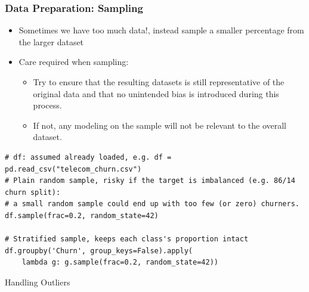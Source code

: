 
\begin{frame}[fragile]\frametitle{Data Preparation: Sampling}
\begin{itemize}
\item Sometimes we have too much data!, instead sample a smaller percentage from the larger dataset
\item Care required when sampling:
	\begin{itemize}
	\item Try to ensure that the resulting datasets is still representative of the original data and that no unintended bias is introduced during this process.
	\item If not, any modeling on the sample will not be relevant to the overall dataset.
	\end{itemize}
\end{itemize}
\begin{lstlisting}
# df: assumed already loaded, e.g. df = pd.read_csv("telecom_churn.csv")
# Plain random sample, risky if the target is imbalanced (e.g. 86/14 churn split):
# a small random sample could end up with too few (or zero) churners.
df.sample(frac=0.2, random_state=42)

# Stratified sample, keeps each class's proportion intact
df.groupby('Churn', group_keys=False).apply(
    lambda g: g.sample(frac=0.2, random_state=42))
\end{lstlisting}
\end{frame}



\begin{frame}
  \begin{center}
    {\Large Handling Outliers}
  \end{center}
\end{frame}



